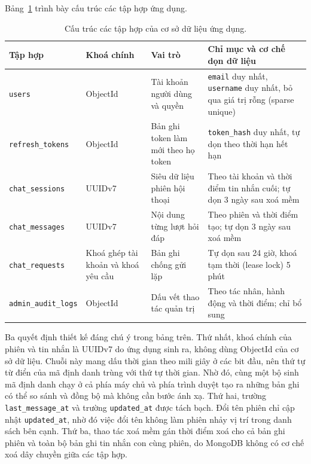 Bảng~\ref{tab:tap-hop-csdl-ung-dung} trình bày cấu trúc các tập hợp ứng dụng.

\begin{table}[htbp]
    \centering
    \caption{Cấu trúc các tập hợp của cơ sở dữ liệu ứng dụng.}
    \label{tab:tap-hop-csdl-ung-dung}
    \small
    \begin{tabularx}{\textwidth}{@{}>{\raggedright\arraybackslash}p{3.5cm}>{\raggedright\arraybackslash}p{2.4cm}>{\raggedright\arraybackslash}p{3.4cm}>{\raggedright\arraybackslash}X@{}}
        \toprule
        \textbf{Tập hợp} & \textbf{Khoá chính} & \textbf{Vai trò} & \textbf{Chỉ mục và cơ chế dọn dữ liệu} \\
        \midrule
        \texttt{users} & ObjectId & Tài khoản người dùng và quyền & \texttt{email} duy nhất, \texttt{username} duy nhất, bỏ qua giá trị rỗng (sparse unique) \\
        \texttt{refresh\_tokens} & ObjectId & Bản ghi token làm mới theo họ token & \texttt{token\_hash} duy nhất, tự dọn theo thời hạn hết hạn \\
        \texttt{chat\_sessions} & UUIDv7 & Siêu dữ liệu phiên hội thoại & Theo tài khoản và thời điểm tin nhắn cuối; tự dọn 3 ngày sau xoá mềm \\
        \texttt{chat\_messages} & UUIDv7 & Nội dung từng lượt hỏi đáp & Theo phiên và thời điểm tạo; tự dọn 3 ngày sau xoá mềm \\
        \texttt{chat\_requests} & Khoá ghép tài khoản và khoá yêu cầu & Bản ghi chống gửi lặp & Tự dọn sau 24 giờ, khoá tạm thời (lease lock) 5 phút \\
        \texttt{admin\_audit\_logs} & ObjectId & Dấu vết thao tác quản trị & Theo tác nhân, hành động và thời điểm; chỉ bổ sung \\
        \bottomrule
    \end{tabularx}
\end{table}

Ba quyết định thiết kế đáng chú ý trong bảng trên. Thứ nhất, khoá chính của phiên và tin nhắn là UUIDv7 do ứng dụng sinh ra, không dùng ObjectId của cơ sở dữ liệu. Chuỗi này mang dấu thời gian theo mili giây ở các bit đầu, nên thứ tự từ điển của mã định danh trùng với thứ tự thời gian. Nhờ đó, cùng một bộ sinh mã định danh chạy ở cả phía máy chủ và phía trình duyệt tạo ra những bản ghi có thể so sánh và đồng bộ mà không cần bước ánh xạ. Thứ hai, trường \texttt{last\_message\_at} và trường \texttt{updated\_at} được tách bạch. Đổi tên phiên chỉ cập nhật \texttt{updated\_at}, nhờ đó việc đổi tên không làm phiên nhảy vị trí trong danh sách bên cạnh. Thứ ba, thao tác xoá mềm gán thời điểm xoá cho cả bản ghi phiên và toàn bộ bản ghi tin nhắn con cùng phiên, do MongoDB không có cơ chế xoá dây chuyền giữa các tập hợp.

